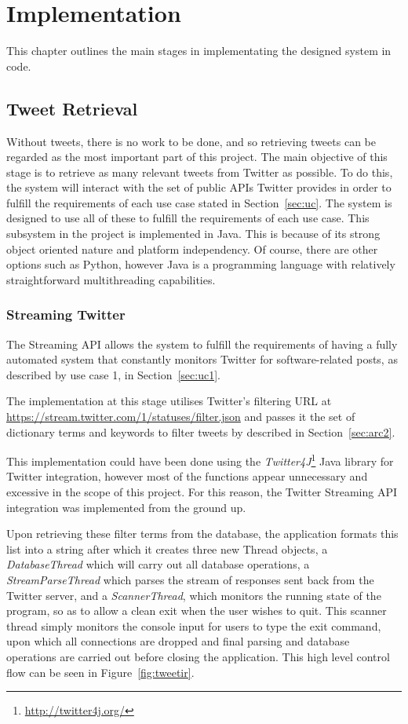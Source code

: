 \chapter{Implementation}
\label{cha:impl}
This chapter outlines the main stages in implementating the designed system in code.


\java
\section{Tweet Retrieval}
Without tweets, there is no work to be done, and so retrieving tweets can be regarded as the most important part of this project. The main objective of this stage is to retrieve as many relevant tweets from Twitter as possible. To do this, the system will interact with the set of public APIs Twitter provides in order to fulfill the requirements of each use case stated in Section~\ref{sec:uc}. The system is designed to use all of these to fulfill the requirements of each use case. This subsystem in the project is implemented in Java. This is because of its strong object oriented nature and platform independency. Of course, there are other options such as Python, however Java is a programming language with relatively straightforward multithreading capabilities.

\subsection{Streaming Twitter}
The Streaming API allows the system to fulfill the requirements of having a fully automated system that constantly monitors Twitter for software-related posts, as described by use case 1, in Section~\ref{sec:uc1}. 

The implementation at this stage utilises Twitter's filtering URL at \url{https://stream.twitter.com/1/statuses/filter.json} and passes it the set of dictionary terms and keywords to filter tweets by described in Section~\ref{sec:arc2}.

This implementation could have been done using the \emph{Twitter4J}\footnote{\url{http://twitter4j.org/}} Java library for Twitter integration, however most of the functions appear unnecessary and excessive in the scope of this project. For this reason, the Twitter Streaming API integration was implemented from the ground up.

Upon retrieving these filter terms from the database, the application formats this list into a string after which it creates three new Thread objects, a \emph{DatabaseThread} which will carry out all database operations, a \emph{StreamParseThread} which parses the stream of responses sent back from the Twitter server, and a \emph{ScannerThread}, which monitors the running state of the program, so as to allow a clean exit when the user wishes to quit. This scanner thread simply monitors the console input for users to type the exit command, upon which all connections are dropped and final parsing and database operations are carried out before closing the application. This high level control flow can be seen in Figure~\ref{fig:tweetir}.

